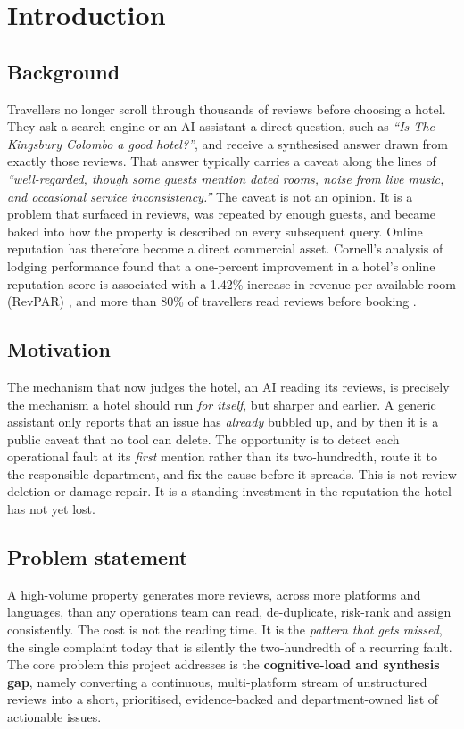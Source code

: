 \documentclass[11pt,a4paper]{article}
\begin{document}
\clearpage
\tableofcontents
\thispagestyle{fancy}
\clearpage

\section{Introduction}

\subsection{Background}
Travellers no longer scroll through thousands of reviews before choosing a hotel. They ask a search
engine or an AI assistant a direct question, such as \textit{``Is The Kingsbury Colombo a good
hotel?''}, and receive a synthesised answer drawn from exactly those reviews. That answer typically
carries a caveat along the lines of \textit{``well-regarded, though some guests mention dated rooms,
noise from live music, and occasional service inconsistency.''} The caveat is not an opinion. It is a
problem that surfaced in reviews, was repeated by enough guests, and became baked into how the property
is described on every subsequent query. Online reputation has therefore become a direct commercial
asset. Cornell's analysis of lodging performance found that a one-percent improvement in a hotel's
online reputation score is associated with a 1.42\% increase in revenue per available room (RevPAR)
\citep{anderson2012social}, and more than 80\% of travellers read reviews before booking
\citep{tripadvisor2019reviews,reputationdefender2023stats}.

\subsection{Motivation}
The mechanism that now judges the hotel, an AI reading its reviews, is precisely the mechanism a hotel
should run \emph{for itself}, but sharper and earlier. A generic assistant only reports that an issue
has \emph{already} bubbled up, and by then it is a public caveat that no tool can delete. The
opportunity is to detect each operational fault at its \emph{first} mention rather than its
two-hundredth, route it to the responsible department, and fix the cause before it spreads. This is not
review deletion or damage repair. It is a standing investment in the reputation the hotel has not yet
lost.

\subsection{Problem statement}
A high-volume property generates more reviews, across more platforms and languages, than any operations
team can read, de-duplicate, risk-rank and assign consistently. The cost is not the reading time. It is
the \emph{pattern that gets missed}, the single complaint today that is silently the two-hundredth of a
recurring fault. The core problem this project addresses is the \textbf{cognitive-load and synthesis
gap}, namely converting a continuous, multi-platform stream of unstructured reviews into a short,
prioritised, evidence-backed and department-owned list of actionable issues.
\end{document}
